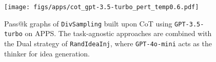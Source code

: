 \begin{figure}[ht]
\vspace{-0.2cm}
    \centering
    \begin{minipage}{0.38\textwidth}
        \texttt{[image: figs/apps/cot\_gpt-3.5-turbo\_pert\_temp0.6.pdf]}
        \label{fig:turbo_cot_scaling}
    \end{minipage}
    \vspace{-0.2cm}
    \caption{Pass@k graphs of \texttt{DivSampling} built upon CoT using \texttt{GPT-3.5-turbo} on APPS. The task-agnostic approaches are combined with the Dual strategy of \texttt{RandIdeaInj}, where \texttt{GPT-4o-mini} acts as the thinker for idea generation.}
    \label{fig:cot_scaling}
\end{figure}